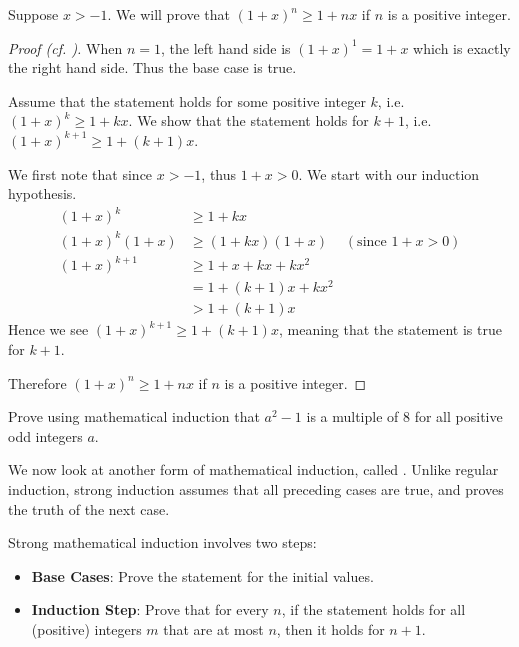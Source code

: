 \begin{example}
    Suppose $x > -1$. We will prove that $(1+x)^n \geq 1+nx$ if $n$ is a positive integer.
    \begin{proof}[Proof (cf. {\cite[p.~186]{hammack_2018}})]
        When $n = 1$, the left hand side is $(1+x)^1 = 1+x$ which is exactly the right hand side. Thus the base case is true.

        Assume that the statement holds for some positive integer $k$, i.e. $(1+x)^k \geq 1+kx$. We show that the statement holds for $k+1$, i.e. $(1+x)^{k+1} \geq 1+(k+1)x$.

        We first note that since $x>-1$, thus $1+x > 0$. We start with our induction hypothesis.
        \begin{align*}
            (1+x)^k &\geq 1+kx\\
            (1+x)^k(1+x) &\geq (1+kx)(1+x) & (\text{since }1+x > 0)\\
            (1+x)^{k+1} &\geq 1 + x + kx + kx^2\\
            &= 1+(k+1)x + kx^2\\
            &> 1+(k+1)x
        \end{align*}
        Hence we see $(1+x)^{k+1} \geq 1+(k+1)x$, meaning that the statement is true for $k+1$.

        Therefore $(1+x)^n \geq 1+nx$ if $n$ is a positive integer.
    \end{proof}
\end{example}

\begin{exercise}
    Prove using mathematical induction that $a^2 - 1$ is a multiple of 8 for all positive odd integers $a$.
\end{exercise}

We now look at another form of mathematical induction, called . Unlike regular induction, strong induction assumes that all preceding cases are true, and proves the truth of the next case.

Strong mathematical induction involves two steps:
\begin{itemize}
    \item \textbf{Base Cases}: Prove the statement for the initial values.
    \item \textbf{Induction Step}: Prove that for every $n$, if the statement holds for all (positive) integers $m$ that are at most $n$, then it holds for $n + 1$.
\end{itemize}


